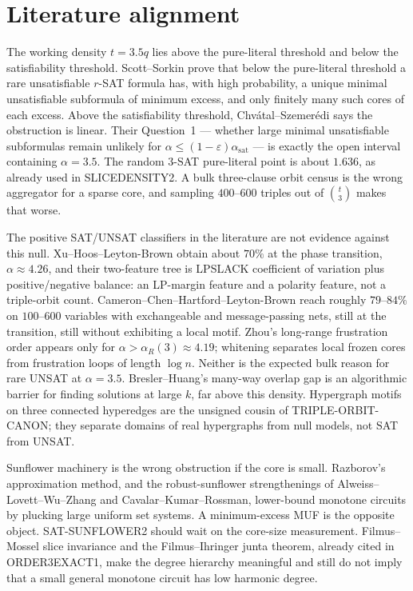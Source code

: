 \documentclass[11pt]{article}
\begin{document}
\section{Literature alignment}
The working density \(t=3.5q\) lies above the pure-literal threshold and below the satisfiability threshold. Scott--Sorkin prove that below the pure-literal threshold a rare unsatisfiable \(r\)-SAT formula has, with high probability, a unique minimal unsatisfiable subformula of minimum excess, and only finitely many such cores of each excess. Above the satisfiability threshold, Chv\'atal--Szemer\'edi says the obstruction is linear. Their Question~1 --- whether large minimal unsatisfiable subformulas remain unlikely for \(\alpha\le(1-\varepsilon)\alpha_{\mathrm{sat}}\) --- is exactly the open interval containing \(\alpha=3.5\). The random \(3\)-SAT pure-literal point is about \(1.636\), as already used in SLICEDENSITY2. A bulk three-clause orbit census is the wrong aggregator for a sparse core, and sampling \(400\)--\(600\) triples out of \(\binom{t}{3}\) makes that worse.

The positive SAT/UNSAT classifiers in the literature are not evidence against this null. Xu--Hoos--Leyton-Brown obtain about \(70\%\) at the phase transition, \(\alpha\approx 4.26\), and their two-feature tree is LPSLACK coefficient of variation plus positive/negative balance: an LP-margin feature and a polarity feature, not a triple-orbit count. Cameron--Chen--Hartford--Leyton-Brown reach roughly \(79\)--\(84\%\) on \(100\)--\(600\) variables with exchangeable and message-passing nets, still at the transition, still without exhibiting a local motif. Zhou's long-range frustration order appears only for \(\alpha>\alpha_R(3)\approx 4.19\); whitening separates local frozen cores from frustration loops of length \(\log n\). Neither is the expected bulk reason for rare UNSAT at \(\alpha=3.5\). Bresler--Huang's many-way overlap gap is an algorithmic barrier for finding solutions at large \(k\), far above this density. Hypergraph motifs on three connected hyperedges are the unsigned cousin of TRIPLE-ORBIT-CANON; they separate domains of real hypergraphs from null models, not SAT from UNSAT.

Sunflower machinery is the wrong obstruction if the core is small. Razborov's approximation method, and the robust-sunflower strengthenings of Alweiss--Lovett--Wu--Zhang and Cavalar--Kumar--Rossman, lower-bound monotone circuits by plucking large uniform set systems. A minimum-excess MUF is the opposite object. SAT-SUNFLOWER2 should wait on the core-size measurement. Filmus--Mossel slice invariance and the Filmus--Ihringer junta theorem, already cited in ORDER3EXACT1, make the degree hierarchy meaningful and still do not imply that a small general monotone circuit has low harmonic degree.
\end{document}
